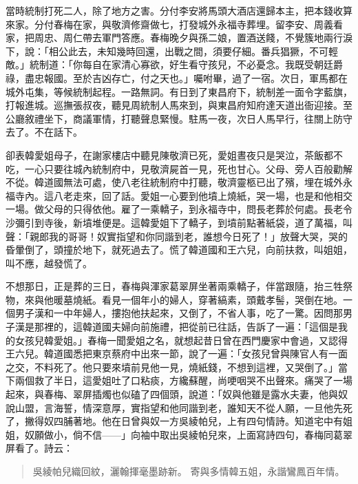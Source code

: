 當時統制打死二人，除了地方之害。分付李安將馬頭大酒店還歸本主，把本錢收算來家。分付春梅在家，與敬濟修齋做七，打發城外永福寺葬埋。留李安、周義看家，把周忠、周仁帶去軍門答應。春梅晚夕與孫二娘，置酒送餞，不覺簇地兩行淚下，說：「相公此去，未知幾時回還，出戰之間，須要仔細。番兵猖獗，不可輕敵。」統制道：「你每自在家清心寡欲，好生看守孩兒，不必憂念。我既受朝廷爵祿，盡忠報國。至於吉凶存亡，付之天也。」囑咐畢，過了一宿。次日，軍馬都在城外屯集，等候統制起程。一路無詞。有日到了東昌府下，統制差一面令字藍旗，打報進城。巡撫張叔夜，聽見周統制人馬來到，與東昌府知府達天道出衙迎接。至公廳敘禮坐下，商議軍情，打聽聲息緊慢。駐馬一夜，次日人馬早行，往關上防守去了。不在話下。

卻表韓愛姐母子，在謝家樓店中聽見陳敬濟已死，愛姐晝夜只是哭泣，茶飯都不吃，一心只要往城內統制府中，見敬濟屍首一見，死也甘心。父母、旁人百般勸解不從。韓道國無法可處，使八老往統制府中打聽，敬濟靈柩已出了殯，埋在城外永福寺內。這八老走來，回了話。愛姐一心要到他墳上燒紙，哭一場，也是和他相交一場。做父母的只得依他。雇了一乘轎子，到永福寺中，問長老葬於何處。長老令沙彌引到寺後，新墳堆便是。這韓愛姐下了轎子，到墳前點著紙袋，道了萬福，叫聲：「親郎我的哥哥！奴實指望和你同諧到老，誰想今日死了！」放聲大哭，哭的昏暈倒了，頭撞於地下，就死過去了。慌了韓道國和王六兒，向前扶救，叫姐姐，叫不應，越發慌了。

不想那日，正是葬的三日，春梅與渾家葛翠屏坐著兩乘轎子，伴當跟隨，抬三牲祭物，來與他暖墓燒紙。看見一個年小的婦人，穿著縞素，頭戴孝髻，哭倒在地。一個男子漢和一中年婦人，摟抱他扶起來，又倒了，不省人事，吃了一驚。因問那男子漢是那裡的，這韓道國夫婦向前施禮，把從前已往話，告訴了一遍：「這個是我的女孩兒韓愛姐。」春梅一聞愛姐之名，就想起昔日曾在西門慶家中會過，又認得王六兒。韓道國悉把東京蔡府中出來一節，說了一遍：「女孩兒曾與陳官人有一面之交，不料死了。他只要來墳前見他一見，燒紙錢，不想到這裡，又哭倒了。」當下兩個救了半日，這愛姐吐了口粘痰，方纔蘇醒，尚哽咽哭不出聲來。痛哭了一場起來，與春梅、翠屏插燭也似磕了四個頭，說道：「奴與他雖是露水夫妻，他與奴說山盟，言海誓，情深意厚，實指望和他同諧到老，誰知天不從人願，一旦他先死了，撇得奴四脯著地。他在日曾與奴一方吳綾帕兒，上有四句情詩。知道宅中有姐姐，奴願做小，倘不信——」向袖中取出吳綾帕兒來，上面寫詩四句，春梅同葛翠屏看了。詩云：
\begin{quote}
吳綾帕兒織回紋，灑翰揮毫墨跡新。
寄與多情韓五姐，永諧鸞鳳百年情。
\end{quote}

